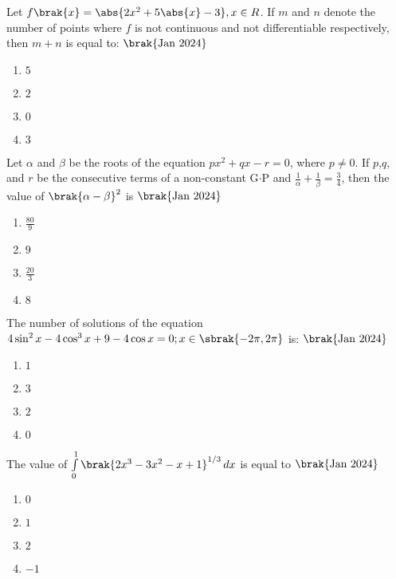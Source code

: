 \iffalse
\title{2024}
\author{EE24BTECH11006}
\section{mcq-single}
\fi
\item{
Let $f\brak{x}=\abs{2x^2+5\abs{x}-3},x\in R$. If $m$ and $n$ denote the number of points where $f$ is not continuous and not differentiable respectively, then $m+n$ is equal to:
\hfill{$\brak{\text{Jan 2024}}$}
\begin{multicols}{4}
\begin{enumerate}
\item$5$
\item$2$
\item$0$
\item$3$
\end{enumerate}
\end{multicols}
}
\item{
Let $\alpha$ and $\beta$ be the roots of the equation $px^2+qx-r=0$, where $p\neq 0$. If $p$,$q$, and $r$ be the consecutive terms of a non-constant G$\cdot$P and $\frac{1}{\alpha}+\frac{1}{\beta}=\frac{3}{4}$, then the value of $\brak{\alpha -\beta}^2$ is 
\hfill{$\brak{\text{Jan 2024}}$}
\begin{multicols}{4}
\begin{enumerate}
\item $\frac{80}{9}$
\item $9$
\item $\frac{20}{3}$
\item $8$
\end{enumerate}
\end{multicols}}
\item{
The number of solutions of the equation $4\sin^2x-4\cos^3x+9-4\cos x=0;x\in\sbrak{-2\pi,2\pi}$ is: 
\hfill{$\brak{\text{Jan 2024}}$}
\begin{multicols}{4}
\begin{enumerate}
\item $1$
\item $3$
\item $2$
\item $0$
\end{enumerate}
\end{multicols}
}
\item{
The value of $\int\limits_{0}^{1}\brak{2x^3-3x^2-x+1}^{1/3}\,dx$ is equal to
\hfill{$\brak{\text{Jan 2024}}$}
\begin{multicols}{4}
\begin{enumerate}
\item $0$
\item $1$
\item $2$
\item $-1$
\end{enumerate}
\end{multicols}
}
